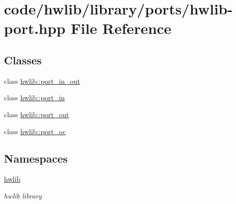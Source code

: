 \hypertarget{hwlib-port_8hpp}{}\section{code/hwlib/library/ports/hwlib-\/port.hpp File Reference}
\label{hwlib-port_8hpp}
\subsection*{Classes}
\begin{DoxyCompactItemize}
\item 
class \hyperlink{classhwlib_1_1port__in__out}{hwlib\+::port\+\_\+in\+\_\+out}
\item 
class \hyperlink{classhwlib_1_1port__in}{hwlib\+::port\+\_\+in}
\item 
class \hyperlink{classhwlib_1_1port__out}{hwlib\+::port\+\_\+out}
\item 
class \hyperlink{classhwlib_1_1port__oc}{hwlib\+::port\+\_\+oc}
\end{DoxyCompactItemize}
\subsection*{Namespaces}
\begin{DoxyCompactItemize}
\item 
 \hyperlink{namespacehwlib}{hwlib}
\begin{DoxyCompactList}\small\item\em hwlib library \end{DoxyCompactList}\end{DoxyCompactItemize}
